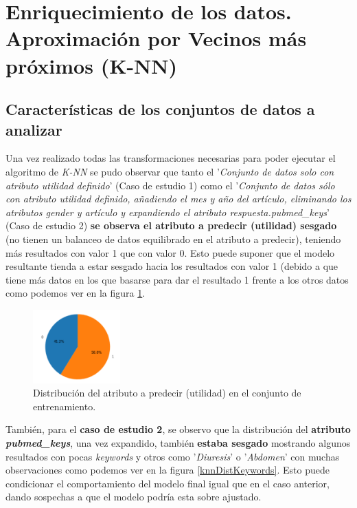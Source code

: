 \section{Enriquecimiento de los datos. Aproximación por Vecinos más próximos (K-NN)}
\label{resultados:knn}

\subsection{Características de los conjuntos de datos a analizar}
\label{resultados:knn_caracteristicas}
Una vez realizado todas las transformaciones necesarias para poder ejecutar el algoritmo de \textit{K-NN} se pudo observar que tanto el '\textit{Conjunto de datos solo con atributo utilidad definido}' (Caso de estudio 1) como el '\textit{Conjunto de datos sólo con atributo utilidad definido, añadiendo el mes y año del artículo, eliminando los atributos gender y artículo y expandiendo el atributo respuesta.pubmed\_keys}' (Caso de estudio 2) \textbf{se observa el atributo a predecir (utilidad) sesgado}\cite{ref:sesgo} (no tienen un balanceo de datos equilibrado en el atributo a predecir), teniendo más resultados con valor 1 que con valor 0. Esto puede suponer que el modelo resultante tienda a estar sesgado\cite{ref:sesgo} hacia los resultados con valor 1 (debido a que tiene más datos en los que basarse para dar el resultado 1 frente a los otros datos como podemos ver en la figura \ref{knnDistUtilidad}.

\begin{figure}[!htb]
  \centering
    \includegraphics[width=0.3\textwidth]{images/resultados_knn_conjunto1.png}
    \caption{Distribución del atributo a predecir (utilidad) en el conjunto de entrenamiento.}
  \label{knnDistUtilidad}
\end{figure}

También, para el \textbf{caso de estudio 2}, se observo que la distribución del \textbf{atributo \textit{pubmed\_keys}}, una vez expandido, también \textbf{estaba sesgado} mostrando algunos resultados con pocas \textit{keywords} y otros como '\textit{Diuresis}' o '\textit{Abdomen}' con muchas observaciones como podemos ver en la figura \ref{knnDistKeywords}. Esto puede condicionar el comportamiento del modelo final igual que en el caso anterior, dando sospechas a que el modelo podría esta sobre ajustado\cite{ref:knn_overfiting}.

